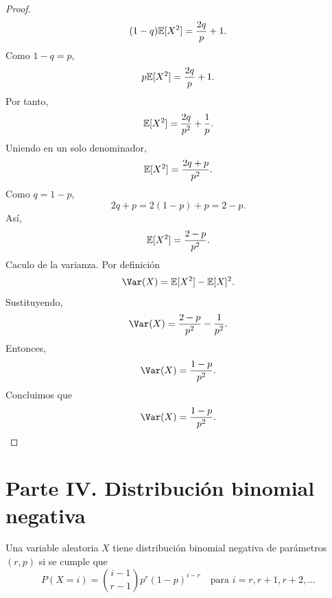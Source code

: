 \documentclass[12pt,a4paper]{article}
\begin{document}
\begin{proof}
\begin{equation*}
            (1-q)\mathbb{E}[X^{2}]=\frac{2q}{p}+1.
        \end{equation*}
        Como $1-q=p$,
        \begin{equation*}
            p\mathbb{E}[X^{2}]=\frac{2q}{p}+1.
        \end{equation*}
        Por tanto,
        \begin{equation*}
            \mathbb{E}[X^{2}]=\frac{2q}{p^{2}}+\frac{1}{p}.
        \end{equation*}
        Uniendo en un solo denominador,
        \begin{equation*}
            \mathbb{E}[X^{2}]=\frac{2q+p}{p^{2}}.
        \end{equation*}
        Como $q=1-p$,
        \begin{equation*}
            2q+p=2(1-p)+p=2-p.
        \end{equation*}
        Así,
        \begin{equation*}
            \mathbb{E}[X^{2}]=\frac{2-p}{p^{2}}.
        \end{equation*}
        Caculo de la varianza. Por definición
        \begin{equation*}
            \Var(X)=\E[X^{2}]-\E[X]^{2}.
        \end{equation*}
        Sustituyendo,
        \begin{equation*}
            \Var(X)=\frac{2-p}{p^{2}}-\frac{1}{p^{2}}.
        \end{equation*}
        Entonces,
        \begin{equation*}
            \Var(X)=\frac{1-p}{p^{2}}.
        \end{equation*}
        Concluimos que
        \begin{equation*}
            \Var(X)=\frac{1-p}{p^{2}}.
        \end{equation*}
    \end{proof}

    \section*{Parte IV. Distribución binomial negativa}

    Una variable aleatoria $X$ tiene distribución binomial negativa de parámetros $(r, p)$ si se cumple que
    \begin{equation*}
        P(X = i) = \binom{i-1}{r-1} p^r (1-p)^{i-r} \quad \text{para } i = r, r+1, r+2, \ldots
    \end{equation*}
\end{document}
